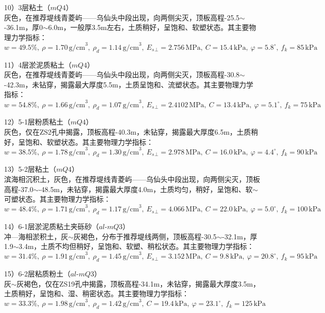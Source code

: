 \documentclass[UTF8, a4paper, 12pt]{ctexart} %
\begin{document}
\par 10）3层粘土（$mQ4$）\\
灰色，在推荐堤线青菱屿——乌仙头中段出现，向两侧尖灭，顶板高程-25.5$\sim$-36.1m，厚0$\sim$6.0m，一般厚3.5m左右，土质稍好，呈饱和、软塑状态。其主要物理力学指标：
\[
w=49.5\%,\ \rho=1.70\, \text{g/cm}^3,\ \rho_d=1.14\, \text{g/cm}^3,\ E_s{_\perp}=2.756\, \text{MPa},\ C=15.4\, \text{kPa},\ \varphi=5.8^\circ,\ f_k=85\, \text{kPa}
\]

\par 11）4层淤泥质粘土（$mQ4$）\\
灰色，在推荐堤线青菱屿——乌仙头中段出现，向两侧尖灭，顶板高程-30.8$\sim$-42.3m，未钻穿，揭露最大厚度5.5m，土质呈饱和、流塑状态。其主要物理力学指标：
\[
w=54.8\%,\ \rho=1.66\, \text{g/cm}^3,\ \rho_d=1.07\, \text{g/cm}^3,\ E_s{_\perp}=2.4102\, \text{MPa},\ C=13.4\, \text{kPa},\ \varphi=5.1^\circ,\ f_k=75\, \text{kPa}
\]

\par 12）5-1层粉质粘土（$mQ4$）\\
灰色，仅在ZS2孔中揭露，顶板高程-40.3m，未钻穿，揭露最大厚度6.5m，土质稍好，呈饱和、软塑状态。其主要物理力学指标：
\[
w=38.5\%,\ \rho=1.78\, \text{g/cm}^3,\ \rho_d=1.30\, \text{g/cm}^3,\ E_s{_\perp}=2.978\, \text{MPa},\ C=16.0\, \text{kPa},\ \varphi=4.4^\circ,\ f_k=90\, \text{kPa}
\]

\par 13）5-2层粘土（$mQ4$）\\
滨海相沉积土，灰色，在推荐堤线青菱屿——乌仙头中段出现，向两侧尖灭，顶板高程-37.0$\sim$-48.5m，未钻穿，揭露最大厚度4.0m，土质均匀，稍好，呈饱和、软$\sim$可塑状态。其主要物理力学指标：
\[
w=48.4\%,\ \rho=1.71\, \text{g/cm}^3,\ \rho_d=1.17\, \text{g/cm}^3,\ E_s{_\perp}=4.066\, \text{MPa},\ C=22.0\, \text{kPa},\ \varphi=5.0^\circ,\ f_k=100\, \text{kPa}
\]

\par 14）6-1层淤泥质粘土夹砾砂（$al$-$mQ3$）\\
冲—海相淤积土，灰$\sim$灰褐色，分布于推荐堤线两侧，顶板高程-30.5$\sim$-32.1m，厚1.9$\sim$3.4m，土质不均但稍好，呈饱和、软塑、稍松状态。其主要物理力学指标：
\[
w=31.4\%,\ \rho=1.91\, \text{g/cm}^3,\ \rho_d=1.45\, \text{g/cm}^3,\ E_s{_\perp}=3.152\, \text{MPa},\ C=9.8\, \text{kPa},\ \varphi=20.8^\circ,\ f_k=95\, \text{kPa}
\]

\par 15）6-2层粘质粉土（$al$-$mQ3$）\\
灰$\sim$灰褐色，仅在ZS19孔中揭露，顶板高程-34.1m，未钻穿，揭露最大厚度3.5m，土质稍好，呈饱和、湿、稍密状态。其主要物理力学指标：
\[
w=33.3\%,\ \rho=1.98\, \text{g/cm}^3,\ \rho_d=1.42\, \text{g/cm}^3,\ C=19.4\, \text{kPa},\ \varphi=23.1^\circ,\ f_k=125\, \text{kPa}
\]
\end{document}
